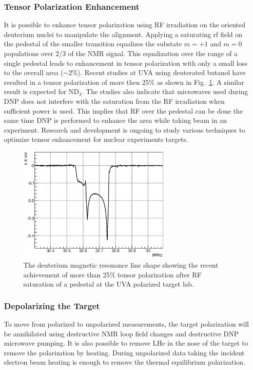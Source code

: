\subsubsection{Tensor Polarization Enhancement}
It is possible to enhance tensor polarization using RF irradiation on the oriented deuterium nuclei to manipulate the alignment.
Applying a saturating rf field on the pedestal of the smaller transition equalizes the substate $m=+1$ and $m=0$ populations
over 2/3 of the NMR signal.  This equalization over the range of a single pedestal leads to enhancement in tensor polarization with only a small loss
to the overall area ($\sim 2\%$).  Recent studies at UVA using deuterated butanol have resulted in a tensor polarization of more then
25\% as shown in Fig.~\ref{fig:study}.  A similar result is expected for ND$_3$.  The studies also indicate that microwaves used during DNP does not
interfere with the saturation from the RF irradiation when sufficient power is used.  This implies that RF over the pedestal can be done the same time DNP is performed to enhance the area while taking beam in an experiment.  Research and development is ongoing to study various
techniques to optimize tensor enhancement for nuclear experiments targets.
\begin{figure}
\centering
\includegraphics[width=3.0in,clip]{figs/study.eps}
\caption{The deuterium magnetic resonance line shape showing the recent achievement of more than 25\% tensor polarization after RF saturation of a pedestal at the UVA polarized target lab.}  
\label{fig:study}
\end{figure}

\subsubsection{Depolarizing the Target}
To move from polarized to unpolarized measurements, the target
polarization will be annihilated using destructive NMR loop field changes and destructive DNP microwave pumping.
It is also possible to remove LHe in the nose of the target to remove the polarization by heating.
During unpolarized data taking the incident electron beam heating is enough to remove the thermal equilibrium polarization.


